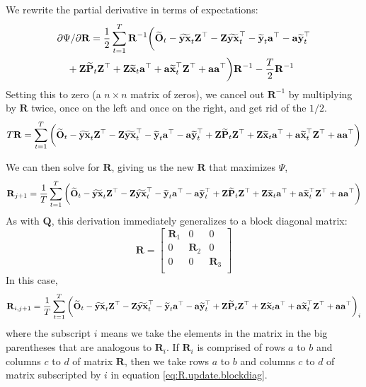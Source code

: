 \documentclass[]{article}
\def\ZZ{\mbox{$\mathbf Z$}}	\def\zz{\mbox{$\mathbf z$}}
\def\OO{\mbox{$\mathbf O$}}
\def\PP{\mbox{$\mathbf P$}}  \def\pp{\mbox{$\mathbf p$}}
\def\QQ{\mbox{$\mathbf Q$}}	 \def\qq{\mbox{$\mathbf q$}}
\def\RR{\mbox{$\mathbf R$}}	 \def\rr{\mbox{$\mathbf r$}}
\def\hatxt{\widetilde{\mbox{$\mathbf x$}}_t}
\def\hatyt{\widetilde{\mbox{$\mathbf y$}}_t}
\def\hatOt{\widetilde{\OO}_t}
\def\hatYXt{\widetilde{\mbox{$\mathbf{y}\mathbf{x}$}}_t}
\def\hatPt{\widetilde{\PP}_t}
\begin{document}
We rewrite the partial derivative in terms of expectations:
\begin{equation}\label{eq:R.unconstrained4}
\begin{split}
&\partial\Psi/\partial\RR = \frac{1}{2} \sum_{t=1}^T \RR^{-1} \bigg( 
\hatOt - \hatYXt\ZZ^\top - \ZZ\hatYXt^\top 
 - \hatyt\aa^\top - \aa\hatyt^\top \\
&\quad + \ZZ\hatPt\ZZ^\top + \ZZ\hatxt\aa^\top + \aa\hatxt^\top\ZZ^\top + \aa\aa^\top \bigg)\RR^{-1} - \frac{T}{2}\RR^{-1} 
\end{split}
\end{equation}
Setting this to zero (a $n \times n$ matrix of zeros), we cancel out $\RR^{-1}$ by multiplying by $\RR$ twice, once on the left and once on the right, and get rid of the $1/2$. 
\begin{equation}\label{eq:R.unconstrained5}
\begin{split}
T\RR = \sum_{t=1}^T \bigg(  
\hatOt - \hatYXt\ZZ^\top - \ZZ\hatYXt^\top 
 - \hatyt\aa^\top - \aa\hatyt^\top 
 + \ZZ\hatPt\ZZ^\top + \ZZ\hatxt\aa^\top + \aa\hatxt^\top\ZZ^\top 
+ \aa\aa^\top \bigg)  
\end{split}
\end{equation}

We can then solve for $\RR$, giving us the new $\RR$ that maximizes $\Psi$, 
\begin{equation}\label{eq:R.update.unconstrained}
\begin{split}
\RR_{j+1} = \frac{1}{T}\sum_{t=1}^T \bigg(  
 \hatOt - \hatYXt\ZZ^\top - \ZZ\hatYXt^\top 
 - \hatyt\aa^\top - \aa\hatyt^\top 
 + \ZZ\hatPt\ZZ^\top + \ZZ\hatxt\aa^\top + \aa\hatxt^\top\ZZ^\top 
 + \aa\aa^\top \bigg)
\end{split}
\end{equation}
As with $\QQ$, this derivation immediately generalizes to a block diagonal matrix:
\begin{equation*}
\RR =
\begin{bmatrix}
\RR_1&0&0\\
0&\RR_2&0\\
0&0&\RR_3\\
\end{bmatrix}
\end{equation*}
In this case,
\begin{equation}\label{eq:R.update.blockdiag}
\begin{split}
\RR_{i,j+1} = \frac{1}{T}\sum_{t=1}^T \bigg(  
 \hatOt - \hatYXt\ZZ^\top - \ZZ\hatYXt^\top 
 - \hatyt\aa^\top - \aa\hatyt^\top 
 + \ZZ\hatPt\ZZ^\top + \ZZ\hatxt\aa^\top + \aa\hatxt^\top\ZZ^\top 
 + \aa\aa^\top \bigg)_i
\end{split}
\end{equation}
where the subscript $i$ means we take the elements in the matrix in the big parentheses that are analogous to $\RR_i$.  If $\RR_i$ is comprised of rows $a$ to $b$ and columns $c$ to $d$ of matrix $\RR$, then we take rows $a$ to $b$ and columns $c$ to $d$ of matrix subscripted by $i$ in equation \ref{eq:R.update.blockdiag}.
\end{document}
